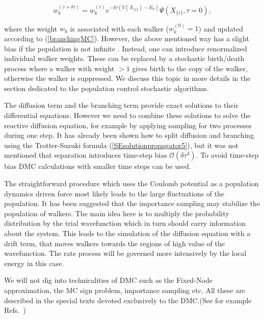 \documentclass[twoside,english]{uiofysmaster}
\begin{document}
\begin{equation}\label{branchingMC}
w_k^{(\tau + \delta \tau)} = w_k^{(\tau)} e^{-\delta \tau(V(X_{\{i\}}) - E_0)}\Psi(X_{\{i\}}, \tau=0),
\end{equation}

where the weight $w_k$ is associated with each walker ($w_k^{(0)}=1$)
and updated according to (\ref{branchingMC}). However, the above  mentioned way
has a slight bias if the population is not infinite
\cite{Aspuru-GuzikQuantumMonteCarlo}. Instead, one can introduce
renormalized individual walker weights. These can be replaced by
a stochastic birth/death process where a walker with weight $> 1$ gives
birth to the copy of the walker, otherwise the walker is suppressed. We
discuss this topic in more  details in the section dedicated to the
population control stochastic algorithms.

The diffusion term and the branching term provide exact solutions to
their differential equations. However we need to combine these
solutions to solve the reactive diffusion equation, for example by
applying sampling for two processes during one step. It has already
been shown how to split diffusion and branching using the
Trotter-Suzuki formula (\ref{SEsolutionpropagator5}), but it was not
mentioned that separation introduces time-step bias
$\mathcal{O}(\delta \tau^3)$.  To avoid time-step bias DMC
calculations with smaller time steps can be used.


The straightforward procedure which uses the Coulomb potential as a
population dynamics driven force most likely leads to the large
fluctuations of the population.  It has been suggested that the
importance sampling may stabilize the population of walkers. The main idea
here is to multiply the probability distribution by the trial
wavefunction which in turn should carry information about the
system. This leads to the simulation of the diffusion equation with a
drift term, that moves walkers towards the regions of high value
of the wavefunction. The rate process will be governed more
intensively by the local energy in this case.

We will not dig into technicalities of DMC such as the Fixed-Node approximation, the MC sign problem, importance sampling etc. All these are described in the special texts devoted exclusively to the DMC.(See for example Refs.~\cite{KolorencApplicationsquantumMonte2011,AustinQuantumMonteCarlo2012,Hjorth-Jensenadvancedcoursecomputational2017,ToulouseIntroductionVariationalDiffusion2016,Aspuru-GuzikQuantumMonteCarlo,KosztinIntroductiondiffusionMonte1996})
\end{document}
